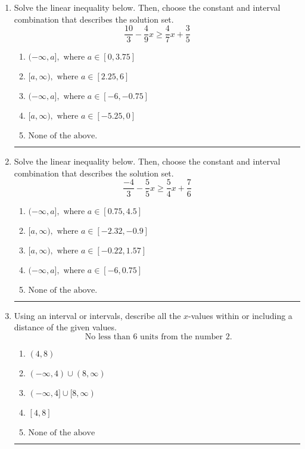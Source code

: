 \documentclass[14pt]{extbook}
\newcommand{\litem}[1]{\item#1\hspace*{-1cm}\rule{\textwidth}{0.4pt}}
\begin{document}
\begin{enumerate}
{\begin{enumerate}[label=\Alph*.]
\end{enumerate} }
\litem{
Solve the linear inequality below. Then, choose the constant and interval combination that describes the solution set.\[ \frac{10}{3} - \frac{4}{9} x \geq \frac{4}{7} x + \frac{3}{5} \]\begin{enumerate}[label=\Alph*.]
\item \( (-\infty, a], \text{ where } a \in [0, 3.75] \)
\item \( [a, \infty), \text{ where } a \in [2.25, 6] \)
\item \( (-\infty, a], \text{ where } a \in [-6, -0.75] \)
\item \( [a, \infty), \text{ where } a \in [-5.25, 0] \)
\item \( \text{None of the above}. \)

\end{enumerate} }
\litem{
Solve the linear inequality below. Then, choose the constant and interval combination that describes the solution set.\[ \frac{-4}{3} - \frac{5}{5} x \geq \frac{5}{4} x + \frac{7}{6} \]\begin{enumerate}[label=\Alph*.]
\item \( (-\infty, a], \text{ where } a \in [0.75, 4.5] \)
\item \( [a, \infty), \text{ where } a \in [-2.32, -0.9] \)
\item \( [a, \infty), \text{ where } a \in [-0.22, 1.57] \)
\item \( (-\infty, a], \text{ where } a \in [-6, 0.75] \)
\item \( \text{None of the above}. \)

\end{enumerate} }
\litem{
Using an interval or intervals, describe all the $x$-values within or including a distance of the given values.\[ \text{ No less than } 6 \text{ units from the number } 2. \]\begin{enumerate}[label=\Alph*.]
\item \( (4, 8) \)
\item \( (-\infty, 4) \cup (8, \infty) \)
\item \( (-\infty, 4] \cup [8, \infty) \)
\item \( [4, 8] \)
\item \( \text{None of the above} \)

\end{enumerate} }
\end{enumerate}
\end{document}
